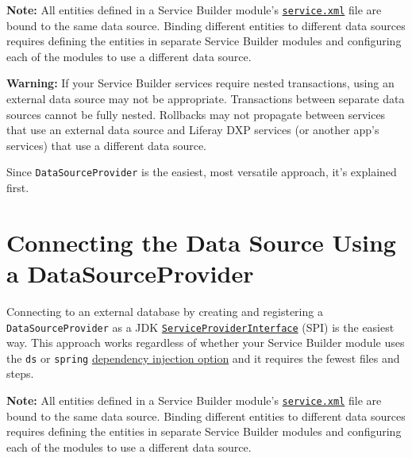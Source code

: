 \noindent\hrulefill

\textbf{Note:} All entities defined in a Service Builder module's
\href{/docs/7-2/appdev/-/knowledge_base/a/creating-the-service-xml-file}{\texttt{service.xml}}
file are bound to the same data source. Binding different entities to
different data sources requires defining the entities in separate
Service Builder modules and configuring each of the modules to use a
different data source.

\noindent\hrulefill

\noindent\hrulefill

\textbf{Warning:} If your Service Builder services require nested
transactions, using an external data source may not be appropriate.
Transactions between separate data sources cannot be fully nested.
Rollbacks may not propagate between services that use an external data
source and Liferay DXP services (or another app's services) that use a
different data source.

\noindent\hrulefill

Since \texttt{DataSourceProvider} is the easiest, most versatile
approach, it's explained first.

\chapter{Connecting the Data Source Using a
DataSourceProvider}\label{connecting-the-data-source-using-a-datasourceprovider}

Connecting to an external database by creating and registering a
\texttt{DataSourceProvider} as a JDK
\href{https://docs.oracle.com/javase/tutorial/sound/SPI-intro.html}{\texttt{ServiceProviderInterface}}
(SPI) is the easiest way. This approach works regardless of whether your
Service Builder module uses the \texttt{ds} or \texttt{spring}
\href{/docs/7-2/appdev/-/knowledge_base/a/defining-global-service-information\#dependency-injector}{dependency
injection option} and it requires the fewest files and steps.

\noindent\hrulefill

\textbf{Note:} All entities defined in a Service Builder module's
\href{/docs/7-2/appdev/-/knowledge_base/a/creating-the-service-xml-file}{\texttt{service.xml}}
file are bound to the same data source. Binding different entities to
different data sources requires defining the entities in separate
Service Builder modules and configuring each of the modules to use a
different data source.

\noindent\hrulefill

